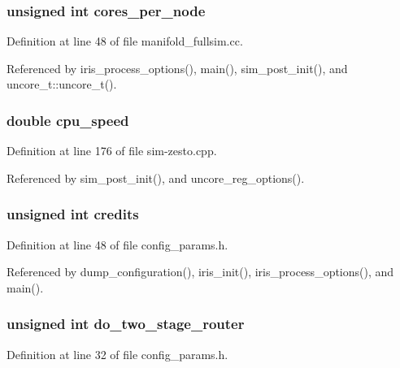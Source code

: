 \subsubsection[{cores\_\-per\_\-node}]{\setlength{\rightskip}{0pt plus 5cm}unsigned int {\bf cores\_\-per\_\-node}}\label{sim_8h_d1fe1c89980f30a3204e89fe23449677}




Definition at line 48 of file manifold\_\-fullsim.cc.

Referenced by iris\_\-process\_\-options(), main(), sim\_\-post\_\-init(), and uncore\_\-t::uncore\_\-t().
\subsubsection[{cpu\_\-speed}]{\setlength{\rightskip}{0pt plus 5cm}double {\bf cpu\_\-speed}}\label{sim_8h_ebb0be7596a98356724d9653c17116c2}




Definition at line 176 of file sim-zesto.cpp.

Referenced by sim\_\-post\_\-init(), and uncore\_\-reg\_\-options().
\subsubsection[{credits}]{\setlength{\rightskip}{0pt plus 5cm}unsigned int {\bf credits}}\label{sim_8h_75e66776a25c2fa845e1ba85ac6329ef}




Definition at line 48 of file config\_\-params.h.

Referenced by dump\_\-configuration(), iris\_\-init(), iris\_\-process\_\-options(), and main().
\subsubsection[{do\_\-two\_\-stage\_\-router}]{\setlength{\rightskip}{0pt plus 5cm}unsigned int {\bf do\_\-two\_\-stage\_\-router}}\label{sim_8h_f584a3fbd576b0061c6c726603cea3e4}




Definition at line 32 of file config\_\-params.h.
